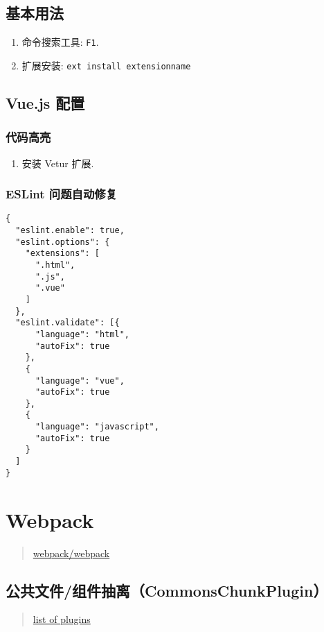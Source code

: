 \subsection{基本用法}\label{ux57faux672cux7528ux6cd5}

\begin{enumerate}
\def\labelenumi{\arabic{enumi}.}
\tightlist
\item
  命令搜索工具: \lstinline!F1!.
\item
  扩展安装: \lstinline!ext install extensionname!
\end{enumerate}

\subsection{Vue.js 配置}\label{vue.js-ux914dux7f6e}

\subsubsection{代码高亮}\label{ux4ee3ux7801ux9ad8ux4eae}

\begin{enumerate}
\def\labelenumi{\arabic{enumi}.}
\tightlist
\item
  安装 Vetur 扩展.
\end{enumerate}

\subsubsection{ESLint
问题自动修复}\label{eslint-ux95eeux9898ux81eaux52a8ux4feeux590d}

\begin{lstlisting}
{
  "eslint.enable": true,
  "eslint.options": {
    "extensions": [
      ".html",
      ".js",
      ".vue"
    ]
  },
  "eslint.validate": [{
      "language": "html",
      "autoFix": true
    },
    {
      "language": "vue",
      "autoFix": true
    },
    {
      "language": "javascript",
      "autoFix": true
    }
  ]
}
\end{lstlisting}

\section{Webpack}\label{webpack}

\begin{quote}
\href{https://github.com/webpack/webpack}{webpack/webpack}
\end{quote}

\subsection{公共文件/组件抽离（CommonsChunkPlugin）}\label{ux516cux5171ux6587ux4ef6ux7ec4ux4ef6ux62bdux79bbcommonschunkplugin}

\begin{quote}
\href{https://github.com/webpack/docs/wiki/list-of-plugins\#commonschunkplugin}{list
of plugins}
\end{quote}
